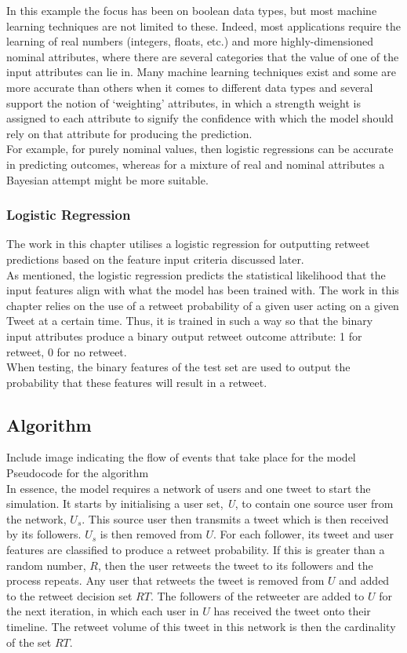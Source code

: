 In this example the focus has been on boolean data types, but most machine learning techniques are not limited to these. Indeed, most applications require the learning of real numbers (integers, floats, etc.) and more highly-dimensioned nominal attributes, where there are several categories that the value of one of the input attributes can lie in. Many machine learning techniques exist and some are more accurate than others when it comes to different data types and several support the notion of `weighting' attributes, in which a strength weight is assigned to each attribute to signify the confidence with which the model should rely on that attribute for producing the prediction.
\\
For example, for purely nominal values, then logistic regressions can be accurate in predicting outcomes, whereas for a mixture of real and nominal attributes a Bayesian attempt might be more suitable. 

\subsubsection{Logistic Regression} 
The work in this chapter utilises a logistic regression for outputting retweet predictions based on the feature input criteria discussed later.
\\
As mentioned, the logistic regression predicts the statistical likelihood that the input features align with what the model has been trained with. The work in this chapter relies on the use of a retweet probability of a given user acting on a given Tweet at a certain time. Thus, it is trained in such a way so that the binary input attributes produce a binary output retweet outcome attribute: 1 for retweet, 0 for no retweet.
\\
When testing, the binary features of the test set are used to output the probability that these features will result in a retweet.

\subsection{Algorithm}
Include image indicating the flow of events that take place for the model
\\
Pseudocode for the algorithm
\\
In essence, the model requires a network of users and one tweet to start the simulation. It starts by initialising a user set, \textit{U}, to contain one source user from the network, $U_s$. This source user then transmits a tweet which is then received by its followers. $U_s$ is then removed from $U$. For each follower, its tweet and user features are classified to produce a retweet probability. If this is greater than a random number, $R$, then the user retweets the tweet to its followers and the process repeats. Any user that retweets the tweet is removed from $U$ and added to the retweet decision set $RT$. The followers of the retweeter are added to $U$ for the next iteration, in which each user in $U$ has received the tweet onto their timeline. The retweet volume of this tweet in this network is then the cardinality of the set $RT$.

